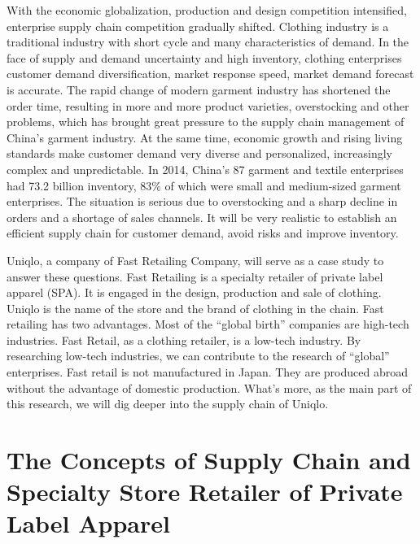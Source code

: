 \documentclass[]{article}
\begin{document}
With the economic globalization, production and design competition
intensified, enterprise supply chain competition gradually shifted.
Clothing industry is a traditional industry with short cycle and many
characteristics of demand. In the face of supply and demand uncertainty
and high inventory, clothing enterprises customer demand
diversification, market response speed, market demand forecast is
accurate. The rapid change of modern garment industry has shortened the
order time, resulting in more and more product varieties, overstocking
and other problems, which has brought great pressure to the supply chain
management of China's garment industry. At the same time, economic
growth and rising living standards make customer demand very diverse and
personalized, increasingly complex and unpredictable. In 2014, China's
87 garment and textile enterprises had 73.2 billion inventory, 83\% of
which were small and medium-sized garment enterprises. The situation is
serious due to overstocking and a sharp decline in orders and a shortage
of sales channels. It will be very realistic to establish an efficient
supply chain for customer demand, avoid risks and improve inventory.

Uniqlo, a company of Fast Retailing Company, will serve as a case study
to answer these questions. Fast Retailing is a specialty retailer of
private label apparel (SPA). It is engaged in the design, production and
sale of clothing. Uniqlo is the name of the store and the brand of
clothing in the chain. Fast retailing has two advantages. Most of the
``global birth'' companies are high-tech industries. Fast Retail, as a
clothing retailer, is a low-tech industry. By researching low-tech
industries, we can contribute to the research of ``global'' enterprises.
Fast retail is not manufactured in Japan. They are produced abroad
without the advantage of domestic production. What's more, as the main
part of this research, we will dig deeper into the supply chain of
Uniqlo.

\hypertarget{the-concepts-of-supply-chain-and-specialty-store-retailer-of-private-label-apparel}{%
\section{The Concepts of Supply Chain and Specialty Store Retailer of
Private Label
Apparel}\label{the-concepts-of-supply-chain-and-specialty-store-retailer-of-private-label-apparel}}
\end{document}
